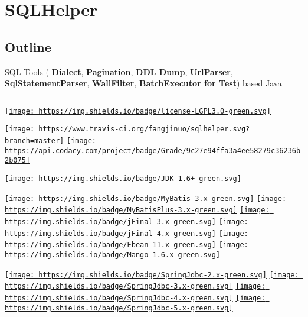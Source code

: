 \documentclass[
]{book}
\begin{document}
\hypertarget{part-sqlhelper}{%
\part*{SQLHelper}\label{part-sqlhelper}}

\hypertarget{sqlhelper_outline}{%
\chapter{Outline}\label{sqlhelper_outline}}

SQL Tools ( \textbf{Dialect}, \textbf{Pagination}, \textbf{DDL Dump}, \textbf{UrlParser}, \textbf{SqlStatementParser}, \textbf{WallFilter}, \textbf{BatchExecutor for Test}) based Java

\begin{center}\rule{0.5\linewidth}{0.5pt}\end{center}

\href{https://github.com/fangjinuo/sqlhelper/blob/master/LICENSE}{\texttt{[image: https://img.shields.io/badge/license-LGPL3.0-green.svg]}}

\href{https://travis-ci.org/fangjinuo/sqlhelper}{\texttt{[image: https://www.travis-ci.org/fangjinuo/sqlhelper.svg?branch=master]}}
\href{https://www.codacy.com/manual/fs1194361820/sqlhelper?utm_source=github.com\&utm_medium=referral\&utm_content=fangjinuo/sqlhelper\&utm_campaign=Badge_Grade}{\texttt{[image: https://api.codacy.com/project/badge/Grade/9c27e94ffa3a4ee58279c36236b2b075]}}

\href{https://www.oracle.com/technetwork/java/javase/downloads/index.html}{\texttt{[image: https://img.shields.io/badge/JDK-1.6+-green.svg]}}

\href{http://www.mybatis.org/mybatis-3/index.html}{\texttt{[image: https://img.shields.io/badge/MyBatis-3.x-green.svg]}}
\href{http://www.mybatis.org/mybatisplus-3/index.html}{\texttt{[image: https://img.shields.io/badge/MyBatisPlus-3.x-green.svg]}}
\href{https://github.com/jfinal/jfinal}{\texttt{[image: https://img.shields.io/badge/jFinal-3.x-green.svg]}}
\href{https://github.com/jfinal/jfinal}{\texttt{[image: https://img.shields.io/badge/jFinal-4.x-green.svg]}}
\href{https://ebean.io/docs/query/sqlquery}{\texttt{[image: https://img.shields.io/badge/Ebean-11.x-green.svg]}}
\href{https://github.com/jfaster/mango}{\texttt{[image: https://img.shields.io/badge/Mango-1.6.x-green.svg]}}

\href{https://spring.io/projects/spring-framework}{\texttt{[image: https://img.shields.io/badge/SpringJdbc-2.x-green.svg]}}
\href{https://spring.io/projects/spring-framework}{\texttt{[image: https://img.shields.io/badge/SpringJdbc-3.x-green.svg]}}
\href{https://spring.io/projects/spring-framework}{\texttt{[image: https://img.shields.io/badge/SpringJdbc-4.x-green.svg]}}
\href{https://spring.io/projects/spring-framework}{\texttt{[image: https://img.shields.io/badge/SpringJdbc-5.x-green.svg]}}
\end{document}
